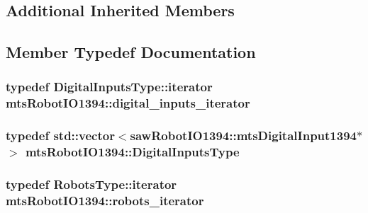 \subsection*{Additional Inherited Members}


\subsection{Member Typedef Documentation}
\hypertarget{classmts_robot_i_o1394_abd444ca2070d97fbd3c0d7d23049efcc}{}
\subsubsection[{digital\+\_\+inputs\+\_\+iterator}]{\setlength{\rightskip}{0pt plus 5cm}typedef Digital\+Inputs\+Type\+::iterator {\bf mts\+Robot\+I\+O1394\+::digital\+\_\+inputs\+\_\+iterator}\hspace{0.3cm}{\ttfamily [protected]}}\label{classmts_robot_i_o1394_abd444ca2070d97fbd3c0d7d23049efcc}
\hypertarget{classmts_robot_i_o1394_ad8b711c653d6fc68084cbe7817e066b9}{}
\subsubsection[{Digital\+Inputs\+Type}]{\setlength{\rightskip}{0pt plus 5cm}typedef std\+::vector$<$saw\+Robot\+I\+O1394\+::mts\+Digital\+Input1394$\ast$$>$ {\bf mts\+Robot\+I\+O1394\+::\+Digital\+Inputs\+Type}\hspace{0.3cm}{\ttfamily [protected]}}\label{classmts_robot_i_o1394_ad8b711c653d6fc68084cbe7817e066b9}
\hypertarget{classmts_robot_i_o1394_a7f8edd25871894ed25f59c68d3c49ece}{}
\subsubsection[{robots\+\_\+iterator}]{\setlength{\rightskip}{0pt plus 5cm}typedef Robots\+Type\+::iterator {\bf mts\+Robot\+I\+O1394\+::robots\+\_\+iterator}\hspace{0.3cm}{\ttfamily [protected]}}\label{classmts_robot_i_o1394_a7f8edd25871894ed25f59c68d3c49ece}
\hypertarget{classmts_robot_i_o1394_ab8da6d2d438f82df01169c5bd528c9b3}{}
